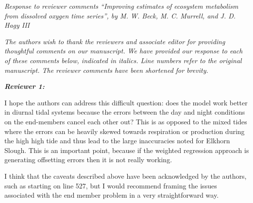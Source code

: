 \documentclass[letterpaper,12pt]{article}\usepackage[]{graphicx}\usepackage[]{color}
\newcommand{\Bigtxt}[1]{\textbf{\textit{#1}}}
\begin{document}
\raggedright


{\it Response to reviewer comments ``Improving estimates of ecosystem metabolism from dissolved oxygen time series'', by M. W. Beck, M. C. Murrell, and J. D. Hagy III}

{\it The authors wish to thank the reviewers and associate editor for providing thoughtful comments on our manuscript.  We have provided our response to each of these comments below, indicated in italics.  Line numbers refer to the original manuscript. The reviewer comments have been shortened for brevity.}

\Bigtxt{Reviewer 1:}

I hope the authors can address this difficult question: does the model work better in diurnal tidal systems because the errors between the day and night conditions on the end-members cancel each other out? This is as opposed to the mixed tides where the errors can be heavily skewed towards respiration or production during the high high tide and thus lead to the large inaccuracies noted for Elkhorn Slough. This is an important point, because if the weighted regression approach is generating offsetting errors then it is not really working.

I think that the caveats described above have been acknowledged by the authors, such as starting on line 527, but I would recommend framing the issues associated with the end member problem in a very straightforward way. 
\end{document}
